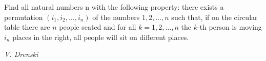 Find all natural numbers n with the following property: there exists a permutation $(i_1,i_2,\ldots,i_n)$ of the numbers $1,2,\ldots,n$ such that, if on the circular table there are $n$ people seated and for all $k=1,2,\ldots,n$ the $k$-th person is moving $i_n$ places in the right, all people will sit on different places.

\textit{V. Drenski}